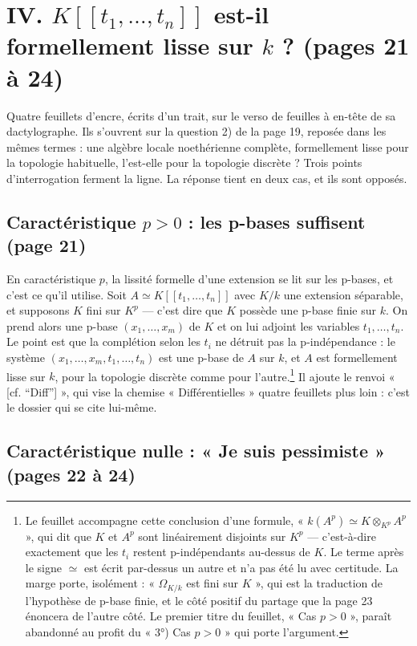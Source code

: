 \documentclass[11pt,a4paper]{article}
\begin{document}
\section*{IV. $K[[t_1,\ldots,t_n]]$ est-il formellement lisse sur $k$ ? (pages 21 à 24)}

Quatre feuillets d'encre, écrits d'un trait, sur le verso de feuilles à en-tête
de sa dactylographe. Ils s'ouvrent sur la question 2) de la page 19, reposée
dans les mêmes termes : une algèbre locale noethérienne complète, formellement
lisse pour la topologie habituelle, l'est-elle pour la topologie discrète ?
Trois points d'interrogation ferment la ligne. La réponse tient en deux cas, et
ils sont opposés.

\subsection*{Caractéristique $p > 0$ : les p-bases suffisent (page 21)}

En caractéristique $p$, la lissité formelle d'une extension se lit sur les
p-bases, et c'est ce qu'il utilise. Soit $A \simeq K[[t_1, \ldots, t_n]]$ avec
$K/k$ une extension séparable, et supposons $K$ fini sur $K^p$ — c'est dire que $K$
possède une p-base finie sur $k$. On prend alors une p-base $(x_1, \ldots,
x_m)$ de $K$ et on lui adjoint les variables $t_1, \ldots, t_n$. Le point est
que la complétion selon les $t_i$ ne détruit pas la p-indépendance : le système
$(x_1, \ldots, x_m, t_1, \ldots, t_n)$ est une p-base de $A$ sur $k$, et $A$
est formellement lisse sur $k$, pour la topologie discrète comme pour
l'autre.\footnote{Le feuillet accompagne cette conclusion d'une formule,
« $k(A^p) \simeq K \otimes_{K^p} A^p$ », qui dit que $K$ et $A^p$ sont
linéairement disjoints sur $K^p$ — c'est-à-dire exactement que les $t_i$
restent p-indépendants au-dessus de $K$. Le terme après le signe $\simeq$ est
écrit par-dessus un autre et n'a pas été lu avec certitude. La marge porte,
isolément : « $\Omega_{K/k}$ est fini sur $K$ », qui est la traduction de
l'hypothèse de p-base finie, et le côté positif du partage que la page 23
énoncera de l'autre côté. Le premier titre du feuillet, « Cas $p > 0$ »,
paraît abandonné au profit du « 3°) Cas $p > 0$ » qui porte l'argument.} Il
ajoute le renvoi « [cf. “Diff”] », qui vise la chemise « Différentielles »
quatre feuillets plus loin : c'est le dossier qui se cite lui-même.

\subsection*{Caractéristique nulle : « Je suis pessimiste » (pages 22 à 24)}
\end{document}
